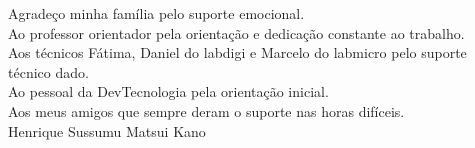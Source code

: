 \begin{agradecimentos}
\vspace{10mm}
\large
Agradeço minha família pelo suporte emocional.\\
Ao professor orientador pela orientação e dedicação constante ao trabalho.\\
Aos técnicos Fátima, Daniel do labdigi e Marcelo do labmicro pelo suporte técnico dado.\\
Ao pessoal da DevTecnologia pela orientação inicial.\\
Aos meus amigos que sempre deram o suporte nas horas difíceis.\\

\vfill
Henrique Sussumu Matsui Kano
\end{agradecimentos}
